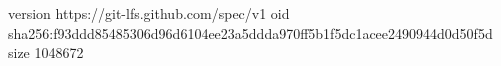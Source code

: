 version https://git-lfs.github.com/spec/v1
oid sha256:f93ddd85485306d96d6104ee23a5ddda970ff5b1f5dc1acee2490944d0d50f5d
size 1048672
